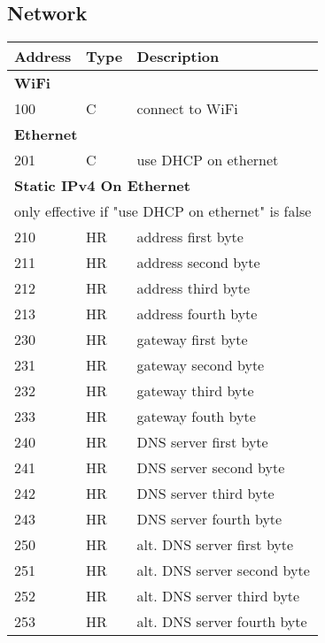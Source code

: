 \documentclass[twocolumn,11pt,a4paper]{extarticle}
\begin{document}
\subsection{Network}
\begin{tabularx}{\columnwidth}{l l X}
	\toprule
	\textbf{Address} & \textbf{Type} & \textbf{Description}\\
	\midrule
	\multicolumn{3}{l}{\textbf{WiFi}}\\
	\midrule
	100 & C & connect to WiFi\\
	\midrule
	\multicolumn{3}{l}{\textbf{Ethernet}}\\
	\midrule
	201 & C & use DHCP on ethernet\\
	\midrule
	\multicolumn{3}{l}{\textbf{Static IPv4 On Ethernet}}\\
	\multicolumn{3}{l}{only effective if "use DHCP on ethernet" is false}\\
	\midrule
	210 & HR & address first byte\\
	211 & HR & address second byte\\
	212 & HR & address third byte\\
	213 & HR & address fourth byte\\
	\midrule
	230 & HR & gateway first byte\\
	231 & HR & gateway second byte\\
	232 & HR & gateway third byte\\
	233 & HR & gateway fouth byte\\
	\midrule
	240 & HR & DNS server first byte\\
	241 & HR & DNS server second byte\\
	242 & HR & DNS server third byte\\
	243 & HR & DNS server fourth byte\\
	\midrule
	250 & HR & alt. DNS server first byte\\
	251 & HR & alt. DNS server second byte\\
	252 & HR & alt. DNS server third byte\\
	253 & HR & alt. DNS server fourth byte\\
	\bottomrule
\end{tabularx}
\vfill
\end{document}
